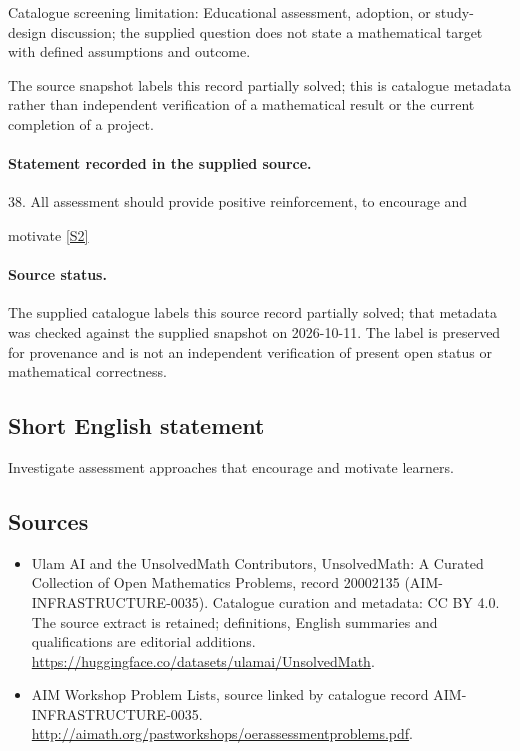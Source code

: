 \documentclass[11pt]{article}
\begin{document}
Catalogue screening limitation: Educational assessment, adoption, or study-design discussion; the supplied question does not state a mathematical target with defined assumptions and outcome.

The source snapshot labels this record partially solved; this is catalogue metadata rather than independent verification of a mathematical result or the current completion of a project.
\paragraph{Statement recorded in the supplied source.}
38. All assessment should provide positive reinforcement, to encourage and

motivate \href{http://aimath.org/pastworkshops/oerassessmentproblems.pdf}{[S2]}
\paragraph{Source status.}
The supplied catalogue labels this source record partially solved; that metadata was checked against the supplied snapshot on 2026-10-11. The label is preserved for provenance and is not an independent verification of present open status or mathematical correctness.
\subsection{Short English statement}
Investigate assessment approaches that encourage and motivate learners.
\subsection{Sources}
\begin{itemize}
\item[S1] Ulam AI and the UnsolvedMath Contributors, UnsolvedMath: A Curated Collection of Open Mathematics Problems, record 20002135 (AIM-INFRASTRUCTURE-0035). Catalogue curation and metadata: CC BY 4.0. The source extract is retained; definitions, English summaries and qualifications are editorial additions.
\url{https://huggingface.co/datasets/ulamai/UnsolvedMath}.
\item[S2] AIM Workshop Problem Lists, source linked by catalogue record AIM-INFRASTRUCTURE-0035.
\url{http://aimath.org/pastworkshops/oerassessmentproblems.pdf}.
\end{itemize}
\end{document}
